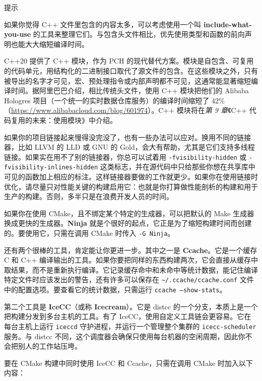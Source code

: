 \begin{myTip}{提示}

如果你觉得 C++ 文件里包含的内容太多，可以考虑使用一个叫 \textbf{include-what-you-use} 的工具来整理它们。与包含头文件相比，优先使用类型和函数的前向声明也能大大缩短编译时间。
\end{myTip}

C++20 提供了 C++ 模块，作为 PCH 的现代替代方案。模块是自包含、可复用的代码单元，用结构化的二进制接口取代了源文件的包含。在这些模块之外，只有被导出的名字才可见，宏、预处理指令或内部声明都不可见，这通常能显著缩短编译时间。据阿里巴巴介绍，相比传统头文件，使用 C++ 模块把他们的 Alibaba Hologres 项目（一个统一的实时数据仓库服务）的编译时间缩短了 42\%（\href{https://www.alibabacloud.com/blog/601974}{https://www.alibabacloud.com/blog/601974}）。C++ 模块将在\emph{第 9 章}《C++ 代码复用的未来：使用模块》中介绍。

如果你的项目链接起来慢得没完没了，也有一些办法可以应对。换用不同的链接器，比如 LLVM 的 LLD 或 GNU 的 Gold，会大有帮助，尤其是它们支持多线程链接。如果实在用不了别的链接器，你总可以试着用 \texttt{-fvisibility-hidden} 或 \texttt{-fvisibility-inlines-hidden} 这类标志，并在源代码中只给那些你想在共享库中可见的函数加上相应的标注。这样链接器要做的工作就更少。如果你在使用链接时优化，请尽量只对性能关键的构建启用它：也就是你打算做性能剖析的构建和用于生产的构建。否则，多半只是在浪费开发人员的时间。

如果你在使用 CMake，且不绑定某个特定的生成器，可以把默认的 Make 生成器换成更快的生成器。\textbf{Ninja} 就是个很好的起点，它正是为了缩短构建时间而创建的。要使用它，只需在调用 CMake 时传入 \texttt{-G Ninja}。

\label{idx:650}
还有两个很棒的工具，肯定能让你更进一步。其中之一是 \textbf{Ccache}。它是一个缓存 C 和 C++ 编译输出的工具。如果你要把同样的东西构建两次，它会直接从缓存中取结果，而不是重新执行编译。它记录缓存命中和未命中等统计数据，能记住编译特定文件时应该发出的警告，还有许多可以保存在 \texttt{\textasciitilde{}/\allowbreak{}.\allowbreak{}ccache/\allowbreak{}ccache.\allowbreak{}conf} 文件中的配置选项。要查看它的统计数据，只需运行 \texttt{ccache --show-stats}。

第二个工具是 \textbf{IceCC}（或称 \textbf{Icecream}）。它是 distcc 的一个分支，本质上是一个把构建分发到多台主机的工具。有了 IceCC，使用自定义工具链会更容易。它在每台主机上运行 \texttt{iceccd} 守护进程，并运行一个管理整个集群的 \texttt{icecc-scheduler} 服务。与 distcc 不同，这个调度器会确保只使用每台机器的空闲周期，因此你不会把别人的工作站压垮。

要在 CMake 构建中同时使用 IceCC 和 Ccache，只需在调用 CMake 时加入以下内容：

